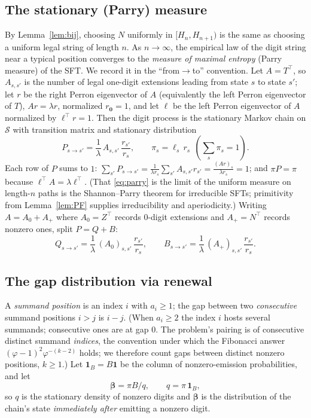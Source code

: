 \documentclass[12pt]{article}
\theoremstyle{definition}
\newcommand{\one}{\mathbf{1}}
\begin{document}
\subsection{The stationary (Parry) measure}
By Lemma~\ref{lem:bij}, choosing $N$ uniformly in $[H_n,H_{n+1})$ is the same as
choosing a uniform legal string of length $n$. As $n\to\infty$, the empirical law
of the digit string near a typical position converges to the
\emph{measure of maximal entropy} (Parry measure) of the SFT. We record it in the
``from$\to$to'' convention. Let $A=T^\top$, so $A_{s,s'}$ is the number of legal
one-digit extensions leading from state $s$ to state $s'$; let $r$ be the right
Perron eigenvector of $A$ (equivalently the left Perron eigenvector of $T$),
$Ar=\lambda r$, normalized $r_{\mathbf 0}=1$, and let $\ell$ be the left Perron
eigenvector of $A$ normalized by $\ell^\top r=1$. Then the digit process is the
stationary Markov chain on $\mathcal S$ with transition matrix and stationary
distribution
\begin{equation}\label{eq:parry}
P_{s\to s'}=\frac{1}{\lambda}\,A_{s,s'}\,\frac{r_{s'}}{r_s},\qquad
\pi_s=\ell_s\, r_s\ \ (\textstyle\sum_s\pi_s=1).
\end{equation}
Each row of $P$ sums to $1$: $\sum_{s'}P_{s\to s'}=\frac1{\lambda r_s}\sum_{s'}A_{s,s'}r_{s'}=\frac{(Ar)_s}{\lambda r_s}=1$;
and $\pi P=\pi$ because $\ell^\top A=\lambda\ell^\top$. (That \eqref{eq:parry} is
the limit of the uniform measure on length-$n$ paths is the Shannon--Parry
theorem for irreducible SFTs; primitivity from Lemma~\ref{lem:PF} supplies
irreducibility and aperiodicity.) Writing $A=A_0+A_+$ where $A_0=Z^\top$ records
$0$-digit extensions and $A_+=N^\top$ records nonzero ones, split $P=Q+B$:
\begin{equation}\label{eq:QB}
Q_{s\to s'}=\frac{1}{\lambda}\,(A_0)_{s,s'}\,\frac{r_{s'}}{r_s},\qquad
B_{s\to s'}=\frac{1}{\lambda}\,(A_+)_{s,s'}\,\frac{r_{s'}}{r_s}.
\end{equation}

\subsection{The gap distribution via renewal}
A \emph{summand position} is an index $i$ with $a_i\ge1$; the gap between two
\emph{consecutive} summand positions $i>j$ is $i-j$. (When $a_i\ge2$ the index $i$
hosts several summands; consecutive ones are at gap $0$. The problem's pairing is
of consecutive distinct summand \emph{indices}, the convention under which the
Fibonacci answer $(\varphi-1)^2\varphi^{-(k-2)}$ holds; we therefore count gaps
between distinct nonzero positions, $k\ge1$.) Let $\mathbf 1_B=B\one$ be the
column of nonzero-emission probabilities, and let
\begin{equation}\label{eq:after}
\boldsymbol\beta=\pi B/q,\qquad q=\pi\,\mathbf 1_B,
\end{equation}
so $q$ is the stationary density of nonzero digits and $\boldsymbol\beta$ is the
distribution of the chain's state \emph{immediately after} emitting a nonzero
digit.
\end{document}
